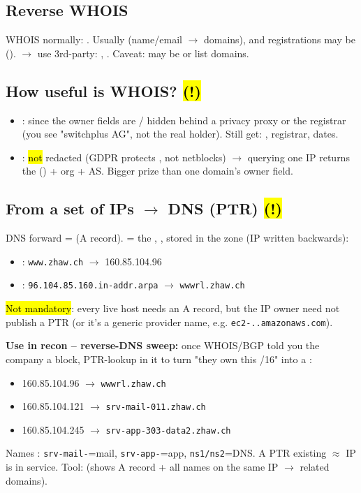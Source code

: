 \subsection{Reverse WHOIS}
WHOIS normally: . Usually  (name/email $\to$ domains), and registrations may be  (). $\to$ use 3rd-party: , . Caveat: may be  or list  domains.

\subsection{How useful is WHOIS? \hl{(!)}}
\begin{itemize}
\item {}: since  the owner fields are  / hidden behind a privacy proxy or the registrar (you see "switchplus AG", not the real holder). Still get: , registrar, dates.
\item {}: \hl{not} redacted (GDPR protects , not netblocks) $\to$ querying one IP returns the  () + org + AS. Bigger prize than one domain's owner field.
\end{itemize}

\subsection{From a set of IPs $\to$ DNS (PTR) \hl{(!)}}
DNS forward =  (A record).  = the , , stored in the  zone (IP written backwards):
{\scriptsize
\begin{itemize}
\item {}: \texttt{www.zhaw.ch} $\to$ 160.85.104.96
\item {}: \texttt{96.104.85.160.in-addr.arpa} $\to$ \texttt{wwwrl.zhaw.ch}
\end{itemize}}
\hl{Not mandatory}: every live host needs an A record, but the IP owner need not publish a PTR (or it's a generic provider name, e.g. \texttt{ec2-..amazonaws.com}).

\textbf{Use in recon -- reverse-DNS sweep:} once WHOIS/BGP told you the company  a block, PTR-lookup  in it to turn "they own this /16" into a :
{\scriptsize
\begin{itemize}
\item 160.85.104.96 $\to$ \texttt{wwwrl.zhaw.ch}
\item 160.85.104.121 $\to$ \texttt{srv-mail-011.zhaw.ch}
\item 160.85.104.245 $\to$ \texttt{srv-app-303-data2.zhaw.ch}
\end{itemize}}
Names : \texttt{srv-mail-}=mail, \texttt{srv-app-}=app, \texttt{ns1/ns2}=DNS. A PTR existing $\approx$ IP is in service. Tool:  (shows A record + all names on the same IP $\to$ related domains).

